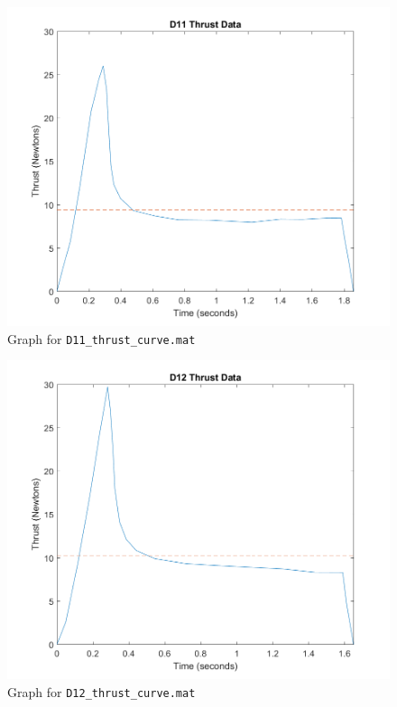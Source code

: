 \documentclass[11pt]{article}
\begin{document}
\begin{figure}
    \centering
    \includegraphics{d11.png}
    \caption{Graph for \texttt{D11\_thrust\_curve.mat}}
    \label{fig:d11}
\end{figure}

\begin{figure}
    \centering
    \includegraphics{d12.png}
    \caption{Graph for \texttt{D12\_thrust\_curve.mat}}
    \label{fig:d12}
\end{figure}
\end{document}
